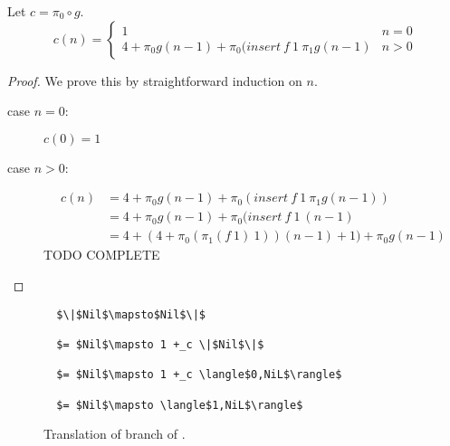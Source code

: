Let $c = \pi_0 \circ g$.
\begin{equation}
  \label{eq:sort_rec_cost}
  c(n) = \begin{cases}
    1 & n=0 \\
    4 + \pi_0 g(n-1) + \pi_0 (insert\ f\ 1\ \pi_1g(n-1) & n > 0
  \end{cases}
\end{equation}

\begin{theorem}
  \label{thm:sort_cost}
\end{theorem}
\begin{proof}
  We prove this by straightforward induction on $n$.
  \begin{description}
    \item[case $n=0$:] $c(0) = 1$
    \item[case $n>0$:]
      \begin{align*}
        c(n) &= 4 + \pi_0 g(n-1) + \pi_0(insert\ f\ 1\ \pi_1g(n-1)) \\
        &= 4 + \pi_0 g(n-1) + \pi_0(insert\ f\ 1\ (n-1) \\
        &= 4 + (4 + \pi_0(\pi_1(f\ 1)\ 1))(n-1) + 1) + \pi_0 g(n-1)
      \end{align*}
      TODO COMPLETE
  \end{description}
\end{proof}



\begin{figure}[H]
  \caption{Translation of  branch of .}
  \label{fig:sort_nil}
  \begin{lstlisting}
  $\|$Nil$\mapsto$Nil$\|$

  $= $Nil$\mapsto 1 +_c \|$Nil$\|$

  $= $Nil$\mapsto 1 +_c \langle$0,NiL$\rangle$

  $= $Nil$\mapsto \langle$1,NiL$\rangle$
  \end{lstlisting}
\end{figure}


